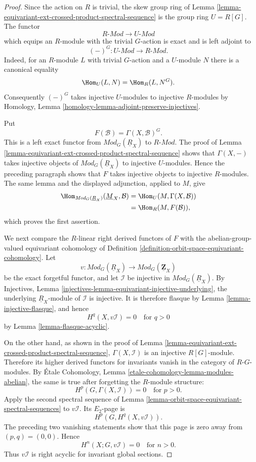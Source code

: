 \begin{proof}
Since the action on $R$ is trivial, the skew group ring of Lemma
\ref{lemma-equivariant-ext-crossed-product-spectral-sequence} is the group
ring $U=R[G]$. The functor
$$
R\text{-}\textit{Mod}\longrightarrow U\text{-}\textit{Mod}
$$
which equips an $R$-module with the trivial $G$-action is exact and is left
adjoint to
$$
(-)^G:U\text{-}\textit{Mod}\longrightarrow R\text{-}\textit{Mod}.
$$
Indeed, for an $R$-module $L$ with trivial $G$-action and a $U$-module $N$
there is a canonical equality
$$
\Hom_U(L,N)=\Hom_R(L,N^G).
$$
Consequently $(-)^G$ takes injective $U$-modules to injective $R$-modules
by Homology, Lemma
\ref{homology-lemma-adjoint-preserve-injectives}.

Put
$$
F(\mathcal B)=\Gamma(X,\mathcal B)^G.
$$
This is a left exact functor from
$\textit{Mod}_G(\underline R_X)$ to $R\text{-}\textit{Mod}$. The proof of
Lemma \ref{lemma-equivariant-ext-crossed-product-spectral-sequence} shows
that $\Gamma(X,-)$ takes injective objects of
$\textit{Mod}_G(\underline R_X)$ to injective $U$-modules. Hence the
preceding paragraph shows that $F$ takes injective objects to injective
$R$-modules. The same lemma and the displayed adjunction, applied to $M$,
give
$$
\begin{aligned}
\Hom_{\textit{Mod}_G(\underline R_X)}
(\underline M_X,\mathcal B)
&=\Hom_U(M,\Gamma(X,\mathcal B))\\
&=\Hom_R(M,F(\mathcal B)),
\end{aligned}
$$
which proves the first assertion.

We next compare the $R$-linear right derived functors of $F$ with the
abelian-group-valued equivariant cohomology of Definition
\ref{definition-orbit-space-equivariant-cohomology}. Let
$$
v:\textit{Mod}_G(\underline R_X)
\longrightarrow
\textit{Mod}_G(\underline{\mathbf{Z}}_X)
$$
be the exact forgetful functor, and let $\mathcal I$ be injective in
$\textit{Mod}_G(\underline R_X)$. By Injectives, Lemma
\ref{injectives-lemma-equivariant-injective-underlying}, the underlying
$\underline R_X$-module of $\mathcal I$ is injective. It is therefore
flasque by Lemma \ref{lemma-injective-flasque}, and hence
$$
H^q(X,v\mathcal I)=0\quad\text{for }q>0
$$
by Lemma \ref{lemma-flasque-acyclic}.

On the other hand, as shown in the proof of Lemma
\ref{lemma-equivariant-ext-crossed-product-spectral-sequence},
$\Gamma(X,\mathcal I)$ is an injective $R[G]$-module. Therefore its higher
derived functors for invariants vanish in the category of $R$-$G$-modules.
By \'Etale Cohomology, Lemma
\ref{etale-cohomology-lemma-modules-abelian}, the same is true after
forgetting the $R$-module structure:
$$
H^p\left(G,\Gamma(X,\mathcal I)\right)=0
\quad\text{for }p>0.
$$
Apply the second spectral sequence of Lemma
\ref{lemma-orbit-space-equivariant-spectral-sequences} to $v\mathcal I$.
Its $E_2$-page is
$$
H^p\left(G,H^q(X,v\mathcal I)\right).
$$
The preceding two vanishing statements show that this page is zero away
from $(p,q)=(0,0)$. Hence
$$
H^n(X;G,v\mathcal I)=0\quad\text{for }n>0.
$$
Thus $v\mathcal I$ is right acyclic for invariant global sections.


\end{proof}
